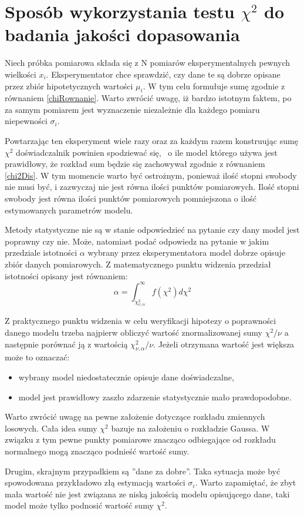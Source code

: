 \section{Sposób wykorzystania testu $\chi^2$ do badania jakości dopasowania} 

Niech próbka pomiarowa składa się z N pomiarów eksperymentalnych pewnych wielkości $x_i$. Eksperymentator chce sprawdzić, czy dane te są dobrze opisane przez zbiór hipotetycznych wartości $\mu_i$. W tym celu formułuje sumę zgodnie z równaniem \ref{chiRownanie}. Warto zwrócić uwagę, iż bardzo istotnym faktem, po za samym pomiarem jest wyznaczenie niezależnie dla każdego pomiaru niepewności $\sigma_i$. 

Powtarzając ten eksperyment wiele razy oraz za każdym razem konstruując sumę $\chi^2$ doświadczalnik powinien spodziewać się, ~o ile model którego używa jest prawidłowy, że rozkład sum będzie się zachowywał zgodnie z równaniem \ref{chi2Dis}. W tym momencie warto być ostrożnym, ponieważ ilość stopni swobody nie musi być, i zazwyczaj nie jest równa ilości punktów pomiarowych. Ilość stopni swobody jest równa ilości punktów pomiarowych pomniejszona o ilość estymowanych parametrów modelu. 

Metody statystyczne nie są w stanie odpowiedzieć na pytanie czy dany model jest poprawny czy nie. Może, natomiast podać odpowiedz na pytanie w jakim przedziale istotności $\alpha$ wybrany przez eksperymentatora model dobrze opisuje zbiór danych pomiarowych. Z matematycznego punktu widzenia przedział istotności opisany jest równaniem:
\begin{equation}
\alpha=\int^{\infty}_{\chi^2_{\nu,\alpha}}f(\chi^2)d\chi^2
\end{equation}

Z praktycznego punktu widzenia w celu weryfikacji hipotezy o poprawności danego modelu trzeba najpierw obliczyć wartość znormalizowanej sumy $\chi^2 \slash \nu $ a następnie porównać ją z wartością $\chi^2_{\nu,\alpha} \slash \nu $. Jeżeli otrzymana wartość jest większa może to oznaczać:
\begin{itemize}
\item wybrany model niedostatecznie opisuje dane doświadczalne, 
\item model jest prawidłowy zaszło zdarzenie statystycznie mało prawdopodobne. 
\end{itemize}

Warto zwrócić uwagę na pewne założenie dotyczące rozkładu zmiennych losowych. Cała idea sumy $\chi^2$ bazuje na założeniu o rozkładzie Gaussa. W związku z tym pewne punkty pomiarowe znacząco odbiegające od rozkładu normalnego mogą znacząco podnieść wartość sumy. 

Drugim, skrajnym przypadkiem są ''dane za dobre''. Taka sytuacja może być spowodowana przykładowo złą estymacją wartości $\sigma_i$. Warto zapamiętać, że zbyt mała wartość nie jest związana ze niską jakością modelu opisującego dane, taki model może tylko podnosić wartość sumy $\chi^2$. 
